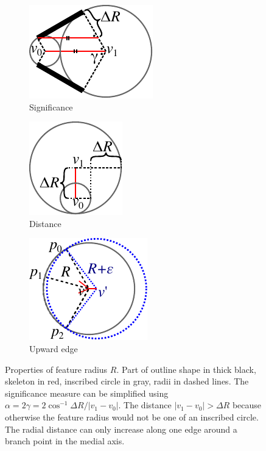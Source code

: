 \begin{figure} \centering
\newlength{\significancePropertiesHeight}
\setlength{\significancePropertiesHeight}{.25\columnwidth}
\begin{subfigure}{0.35\columnwidth} \centering
\includegraphics[height=\significancePropertiesHeight]{sources/method/distance_based_angles.pdf}
\caption{Significance}
\label{distance_based_angles}
\end{subfigure}
\begin{subfigure}{0.3\columnwidth} \centering
\includegraphics[height=\significancePropertiesHeight]{sources/method/distance_ratio_limit.pdf}
\caption{Distance}
\label{distance_ratio_limit}
\end{subfigure}
\begin{subfigure}{0.3\columnwidth} \centering
\includegraphics[height=\significancePropertiesHeight]{sources/method/branch_upward_edge_property.pdf}
\caption{Upward edge}
\label{branch_upward_edge_property}
\end{subfigure}
\caption{
Properties of feature radius $R$.
Part of outline shape in thick black,
skeleton in red,
inscribed circle in gray,
radii in dashed lines.
 The significance measure can be simplified using $\alpha = 2 \gamma = 2 \cos^{-1} \Delta R / |v_1 - v_0|$.
 The distance $|v_1 - v_0| > \Delta R$ because otherwise the feature radius would not be one of an inscribed circle.
 The radial distance can only increase along one edge around a branch point in the medial axis.
}
\end{figure}




